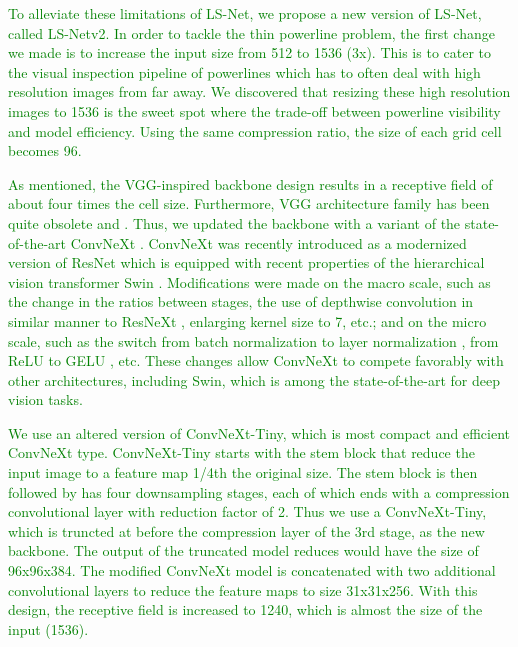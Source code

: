 \documentclass[journal]{IEEEtran}
\begin{document}
\textcolor{green}{To alleviate these limitations of LS-Net, we propose a new version of LS-Net, called LS-Netv2. In order to tackle the thin powerline problem, the first change we made is to increase the input size from 512 to 1536 (3x). This is to cater to the visual inspection pipeline of powerlines which has to often deal with high resolution images from far away. We discovered that resizing these high resolution images to 1536 is the sweet spot where the trade-off between powerline visibility and model efficiency. Using the same compression ratio, the size of each grid cell becomes 96.}

\textcolor{green}{As mentioned, the VGG-inspired backbone design results in a receptive field of about four times the cell size. Furthermore, VGG architecture family has been quite obsolete and . Thus, we updated the backbone with a variant of the state-of-the-art ConvNeXt \cite{convnext}. ConvNeXt was recently introduced as a modernized version of ResNet \cite{resnet} which is equipped with recent properties of the hierarchical vision transformer Swin \cite{swin}. Modifications were made on the macro scale, such as the change in the ratios between stages, the use of depthwise convolution in similar manner to ResNeXt \cite{resnext}, enlarging kernel size to 7, etc.; and on the micro scale, such as the switch from batch normalization \cite{batchnorm} to layer normalization \cite{layernorm}, from ReLU \cite{relu} to GELU \cite{gelu}, etc. These changes allow ConvNeXt to compete favorably with other architectures, including Swin, which is among the state-of-the-art for deep vision tasks.}

\textcolor{green}{We use an altered version of ConvNeXt-Tiny, which is most compact and efficient ConvNeXt type. ConvNeXt-Tiny starts with the stem block that reduce the input image to a feature map 1/4th the original size. The stem block is then followed by has four downsampling stages, each of which ends with a compression convolutional layer with reduction factor of 2. Thus we use a ConvNeXt-Tiny, which is truncted at before the compression layer of the 3rd stage, as the new backbone. The output of the truncated model reduces would have the size of 96x96x384. The modified ConvNeXt model is concatenated with two additional convolutional layers to reduce the feature maps to size 31x31x256. With this design, the receptive field is increased to 1240, which is almost the size of the input (1536).}
\end{document}

